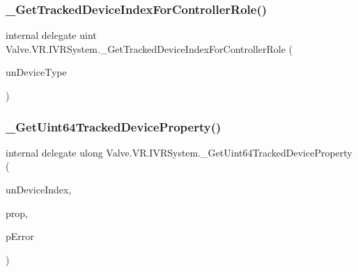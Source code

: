 \mbox{\label{struct_valve_1_1_v_r_1_1_i_v_r_system_a78755de15fec7aaaccc22d7539a7492a}} 
\subsubsection{\texorpdfstring{\_GetTrackedDeviceIndexForControllerRole()}{\_GetTrackedDeviceIndexForControllerRole()}}
{\footnotesize\ttfamily internal delegate uint Valve.\+V\+R.\+I\+V\+R\+System.\+\_\+\+Get\+Tracked\+Device\+Index\+For\+Controller\+Role (\begin{DoxyParamCaption}\item[{\mbox{\hyperlink{namespace_valve_1_1_v_r_a7814f024ae1755837d784b5263e05792}{E\+Tracked\+Controller\+Role}}}]{un\+Device\+Type }\end{DoxyParamCaption})}

\mbox{\label{struct_valve_1_1_v_r_1_1_i_v_r_system_a2cd6c3c2bdb9cbf7ee06115283aa3640}} 
\subsubsection{\texorpdfstring{\_GetUint64TrackedDeviceProperty()}{\_GetUint64TrackedDeviceProperty()}}
{\footnotesize\ttfamily internal delegate ulong Valve.\+V\+R.\+I\+V\+R\+System.\+\_\+\+Get\+Uint64\+Tracked\+Device\+Property (\begin{DoxyParamCaption}\item[{uint}]{un\+Device\+Index,  }\item[{\mbox{\hyperlink{namespace_valve_1_1_v_r_ab060521ead7273986988fc4897e52482}{E\+Tracked\+Device\+Property}}}]{prop,  }\item[{ref \mbox{\hyperlink{namespace_valve_1_1_v_r_aab6684f03930a2d2cf22ed66b437e47b}{E\+Tracked\+Property\+Error}}}]{p\+Error }\end{DoxyParamCaption})}

\mbox{\label{struct_valve_1_1_v_r_1_1_i_v_r_system_a82b26bcb84c59e3b886653e6f52c9fdf}} 
